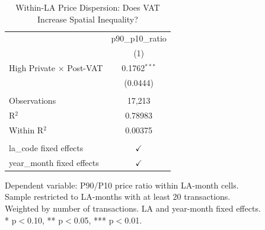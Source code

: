 
\begin{table}[htbp]
   \caption{\label{tab:dispersion} Within-LA Price Dispersion: Does VAT Increase Spatial Inequality?}
   \bigskip
   \centering
   \begin{tabular}{lc}
      \toprule
                                      & p90\_p10\_ratio\\    
                                      & (1)\\  
      \midrule 
      High Private $\times$ Post-VAT  & 0.1762$^{***}$\\   
                                      & (0.0444)\\   
       \\
      Observations                    & 17,213\\  
      R$^2$                           & 0.78983\\  
      Within R$^2$                    & 0.00375\\  
       \\
      la\_code fixed effects          & $\checkmark$\\   
      year\_month fixed effects       & $\checkmark$\\   
      \bottomrule
   \end{tabular}
   
   \par \raggedright 
   Dependent variable: P90/P10 price ratio within LA-month cells.\\
   Sample restricted to LA-months with at least 20 transactions.\\
   Weighted by number of transactions. LA and year-month fixed effects.\\
   * p$<$0.10, ** p$<$0.05, *** p$<$0.01.
\end{table}


